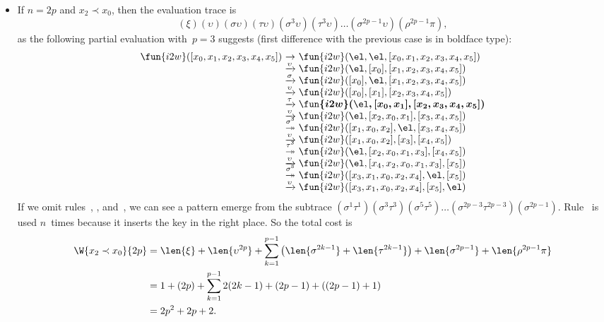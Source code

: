 \begin{itemize}
  \item If \(n = 2p\) and \(x_2 \prec x_0\), then the evaluation trace is
    \begin{equation*}
      (\xi)(\upsilon)(\sigma\upsilon)(\tau\upsilon)
      (\sigma^3\upsilon)(\tau^3\upsilon)
      \ldots (\sigma^{2p-1}\upsilon)(\rho^{2p-1}\pi),
    \end{equation*}
    as the following partial evaluation with~\(p=3\) suggests (first
    difference with the previous case is in boldface type):
\begin{equation*}
\begin{array}{@{}r@{\;}c@{\;}l@{}}
\fun{i2w}([x_{0},x_{1},x_{2},x_{3},x_{4},x_{5}])
& \rightarrow
& \fun{i2w}(\el,\el,[x_{0},x_{1},x_{2},x_{3},x_{4},x_{5}])\\
& \xrightarrow{\smash{\upsilon}}
& \fun{i2w}(\el,[x_{0}],[x_{1},x_{2},x_{3},x_{4},x_{5}])\\
& \xrightarrow{\smash{\sigma}}
& \fun{i2w}([x_{0}],\el,[x_{1},x_{2},x_{3},x_{4},x_{5}])\\
& \xrightarrow{\smash{\upsilon}}
& \fun{i2w}([x_{0}],[x_{1}],[x_{2},x_{3},x_{4},x_{5}])\\
& \xrightarrow{\smash{\tau}}
& \boldsymbol{\fun{i2w}(\el,[x_{0},x_{1}],[x_{2},x_{3},x_{4},x_{5}])}\\
& \xrightarrow{\smash{\upsilon}}
& \fun{i2w}(\el,[x_{2},x_{0},x_{1}],[x_{3},x_{4},x_{5}])\\
& \stackrel{\smash{\sigma^{\smash{3}}}}{\twoheadrightarrow}
& \fun{i2w}([x_{1},x_{0},x_{2}],\el,[x_{3},x_{4},x_{5}])\\
& \xrightarrow{\smash{\upsilon}}
& \fun{i2w}([x_{1},x_{0},x_{2}],[x_{3}],[x_{4},x_{5}])\\
& \stackrel{\smash{\tau^{\smash{3}}}}{\twoheadrightarrow}
& \fun{i2w}(\el,[x_{2},x_{0},x_{1},x_{3}],[x_{4},x_{5}])\\
& \xrightarrow{\smash{\upsilon}}
& \fun{i2w}(\el,[x_{4},x_{2},x_{0},x_{1},x_{3}],[x_{5}])\\
& \stackrel{\smash{\sigma^{\smash{5}}}}{\twoheadrightarrow}
& \fun{i2w}([x_{3},x_{1},x_{0},x_{2},x_{4}],\el,[x_{5}])\\
& \xrightarrow{\smash{\upsilon}}
& \fun{i2w}([x_{3},x_{1},x_{0},x_{2},x_{4}],[x_{5}],\el)
\end{array}
\end{equation*}
If we omit rules~\clause{\xi}, \clause{\upsilon}, \clause{\pi}
and~\clause{\rho}, we can see a pattern emerge from the subtrace
\((\sigma^1\tau^1)(\sigma^3\tau^3)(\sigma^5\tau^5) \ldots
(\sigma^{2p-3}\tau^{2p-3})(\sigma^{2p-1})\). Rule~\clause{\upsilon} is
used \(n\)~times because it inserts the key in the right place. So the
total cost is
\begin{align*}
\W{x_2 \prec x_0}{2p}
   &= \len{\xi} + \len{\upsilon^{2p}}
           + \sum_{k=1}^{p-1}{\left(\len{\sigma^{2k-1}} + \len{\tau^{2k-1}}\right)}
           + \len{\sigma^{2p-1}} + \len{\rho^{2p-1}\pi}\\
   &= 1 + (2p) + \sum_{k=1}^{p-1}{2(2k-1)} + (2p-1) + ((2p - 1) + 1)\\
   &= 2p^2 + 2p + 2.
\end{align*}
\end{itemize}
